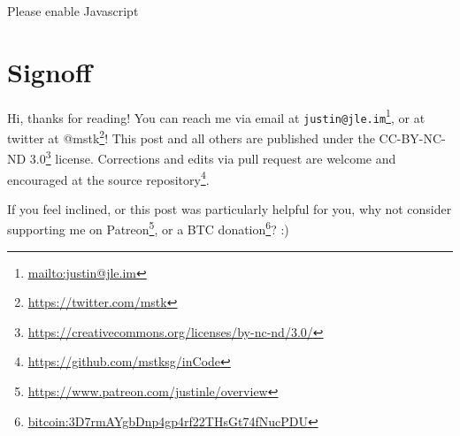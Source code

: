 \documentclass[]{article}
\renewcommand{\href}[2]{#2\footnote{\url{#1}}}
\begin{document}
\leavevmode\hypertarget{golFlat}{}%
Please enable Javascript

\hypertarget{signoff}{%
\section{Signoff}\label{signoff}}

Hi, thanks for reading! You can reach me via email at
\href{mailto:justin@jle.im}{\nolinkurl{justin@jle.im}}, or at twitter at
\href{https://twitter.com/mstk}{@mstk}! This post and all others are published
under the \href{https://creativecommons.org/licenses/by-nc-nd/3.0/}{CC-BY-NC-ND
3.0} license. Corrections and edits via pull request are welcome and encouraged
at \href{https://github.com/mstksg/inCode}{the source repository}.

If you feel inclined, or this post was particularly helpful for you, why not
consider \href{https://www.patreon.com/justinle/overview}{supporting me on
Patreon}, or a \href{bitcoin:3D7rmAYgbDnp4gp4rf22THsGt74fNucPDU}{BTC donation}?
:)
\end{document}
